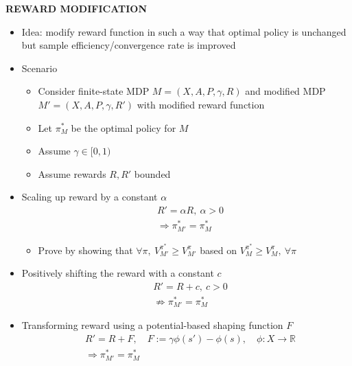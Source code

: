 \begin{whitebox}{\textbf{REWARD MODIFICATION}}
    \begin{itemize}
        \item Idea: modify reward function in such a way that optimal policy is unchanged but sample efficiency/convergence rate is improved
        \item Scenario
        \begin{itemize}
            \item Consider finite-state MDP $M=(X,A,P,\gamma,R)$ and modified MDP $M'=(X,A,P,\gamma,R')$ with modified reward function
            \item Let $\pi_M^*$ be the optimal policy for $M$
            \item Assume $\gamma\in[0,1)$
            \item Assume rewards $R,R'$ bounded
        \end{itemize}
        \item Scaling up reward by a constant $\alpha$
        \begin{align*}
            &R'=\alpha R,\ \alpha>0\\
            &\Rightarrow\pi_{M'}^*=\pi_M^*
        \end{align*}
        \begin{itemize}
            \item Prove by showing that $\forall\pi,\ V_{M'}^{\pi^*}\geq V_{M'}^{\pi}$ based on $V_M^{\pi^*}\geq V_M^\pi,\ \forall\pi$
        \end{itemize}
        \item Positively shifting the reward with a constant $c$
        \begin{align*}
            &R'=R+c,\ c>0\\
            &\not\Rightarrow\pi_{M'}^*=\pi_M^*
        \end{align*}
        \item Transforming reward using a potential-based shaping function $F$
        \begin{align*}
            &R'=R+F,\quad F:=\gamma\phi(s')-\phi(s),\quad\phi:X\to\mathbb{R}\\
            &\Rightarrow\pi_{M'}^*=\pi_M^*
        \end{align*}
    \end{itemize}
\end{whitebox}